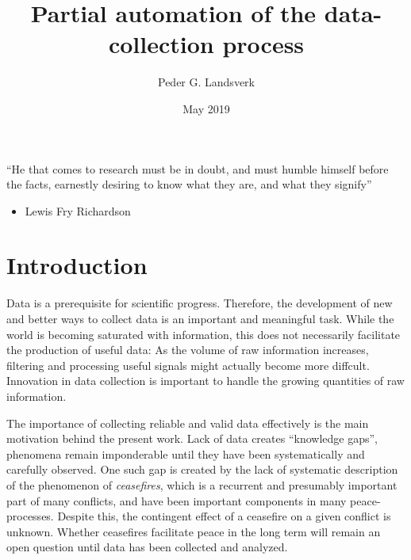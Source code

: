 \documentclass[12pt,twoside]{reedthesis}
\title{Partial automation of the data-collection process}
\author{Peder G. Landsverk}
\date{May 2019}
\providecommand{\tightlist}{%
  \setlength{\itemsep}{0pt}\setlength{\parskip}{0pt}}
\begin{document}
  \maketitle

\frontmatter %
\pagestyle{empty} %



  \hypersetup{linkcolor=black}
  \setcounter{tocdepth}{1}
  \tableofcontents

  \listoftables

  \listoffigures

  \begin{dedication}
    ``He that comes to research must be in doubt, and must humble himself
    before the facts, earnestly desiring to know what they are, and what
    they signify''
    \begin{itemize}
    \tightlist
    \item
      Lewis Fry Richardson
    \end{itemize}
  \end{dedication}
\mainmatter %
\pagestyle{fancyplain} %

\chapter*{Introduction}\label{introduction}

Data is a prerequisite for scientific progress. Therefore, the
development of new and better ways to collect data is an important and
meaningful task. While the world is becoming saturated with information,
this does not necessarily facilitate the production of useful data: As
the volume of raw information increases, filtering and processing useful
signals might actually become more diffcult. Innovation in data
collection is important to handle the growing quantities of raw
information.

The importance of collecting reliable and valid data effectively is the
main motivation behind the present work. Lack of data creates
``knowledge gaps'', phenomena remain imponderable until they have been
systematically and carefully observed. One such gap is created by the
lack of systematic description of the phenomenon of \emph{ceasefires},
which is a recurrent and presumably important part of many conflicts,
and have been important components in many peace-processes. Despite
this, the contingent effect of a ceasefire on a given conflict is
unknown. Whether ceasefires facilitate peace in the long term will
remain an open question until data has been collected and analyzed.
\end{document}
